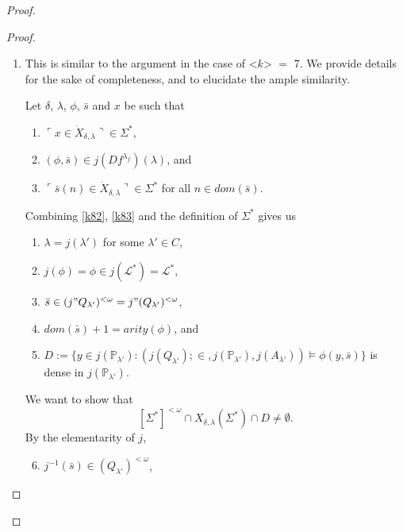 \documentclass[12pt, twoside]{memoir}
\numberwithin{equation}{section}
\theoremstyle{definition}
\theoremstyle{remark}
\theoremstyle{definition}
\theoremstyle{definition}
\theoremstyle{definition}
\theoremstyle{remark}
\newcommand{\eq}{=}
\begin{document}
\begin{proof}
\begin{proof}
\begin{enumerate}[label=<$k$> $\eq$ \arabic* :, leftmargin=70pt]
\begin{enumerate}[label=Case \arabic*:, leftmargin=50pt]
\begin{align*}
        \end{align*}
        and
        \begin{align*}
            X_{\delta, \lambda}(\Sigma^*) \cap j(A_{\lambda'}) = j" (X_{\delta, \lambda'}(\bigcup g) \cap A_{\lambda'}),
        \end{align*}
        we can conclude $$(X_{\delta, \lambda}(\Sigma^*); \in, j(\mathbb{P}_{\lambda'}), j(A_{\lambda'})) \models \exists r \ \phi(r, \bar{s})$$ by invoking the elementarity of $j$ yet again.
    \end{enumerate}
    \item This is similar to the argument in the case of <$k$> $\eq$ 7. We provide details for the sake of completeness, and to elucidate the ample similarity. 
    
    Let $\delta$, $\lambda$, $\phi$, $\bar{s}$ and $x$ be such that 
    \begin{enumerate}[label=(K8.\arabic*), leftmargin=50pt]
        \item $\ulcorner x \in \dot{X}_{\delta, \lambda} \urcorner \in \Sigma^*$,
        \item\label{k82} $(\phi, \bar{s}) \in j(Df^{\lambda_f})(\lambda)$, and
        \item\label{k83} $\ulcorner \bar{s}(n) \in \dot{X}_{\delta, \lambda} \urcorner \in \Sigma^*$ for all $n \in dom(\bar{s})$.
    \end{enumerate}
    Combining \ref{k82}, \ref{k83} and the definition of $\Sigma^*$ gives us 
    \begin{enumerate}[label=(\alph*)]
        \item $\lambda = j(\lambda')$ for some $\lambda' \in C$,
        \item $j(\phi) = \phi \in j(\mathcal{L}^*) = \mathcal{L}^*$,
        \item $\bar{s} \in (j" Q_{\lambda'})^{< \omega} = j" (Q_{\lambda'})^{< \omega}$,
        \item $dom(\bar{s}) + 1 = arity(\phi)$, and
        \item $D := \{y \in j(\mathbb{P}_{\lambda'}) : (j(Q_{\lambda'}); \in, j(\mathbb{P}_{\lambda'}), j(A_{\lambda'})) \models \phi(y, \bar{s})\}$ is dense in $j(\mathbb{P}_{\lambda'})$.
    \end{enumerate}
    We want to show that $$[\Sigma^*]^{< \omega} \cap X_{\delta, \lambda}(\Sigma^*) \cap D \neq \emptyset.$$ By the elementarity of $j$, 
    \begin{enumerate}[label=(\alph*)]
        \setcounter{enumii}{5}
        \item $j^{-1}(\bar{s}) \in (Q_{\lambda'})^{< \omega}$, 

\end{enumerate}
\end{enumerate}
\end{proof}
\end{proof}
\end{document}
